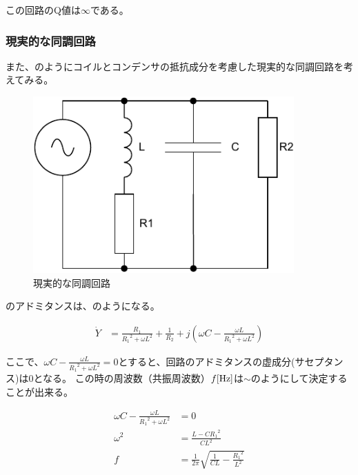 \documentclass[report.tex]{subfiles}
\begin{document}
この回路のQ値は\(\infty\)である。

\subsubsection{現実的な同調回路}\label{sec:real}

また、のようにコイルとコンデンサの抵抗成分を考慮した現実的な同調回路を考えてみる。

\begin{figure}[H]
	\centering
	\includegraphics[width=10cm]{fig/kyo2.pdf}
	\caption{現実的な同調回路}
	\label{fig:kyo2}
\end{figure}

のアドミタンスは、のようになる。

\begin{align}
	\dot{Y} & = \frac{R_1}{{R_1}^2+ {\omega L}^2} + \frac{1}{R_2} + j(\omega C - \frac{\omega L}{{R_1}^2+ {\omega L}^2})\label{eq:impedance2}
\end{align}

ここで、$\omega C - \frac{\omega L}{{R_1}^2+ {\omega L}^2} = 0$とすると、回路のアドミタンスの虚成分(サセプタンス)は0となる。
この時の周波数（共振周波数）\(f\rm{[Hz]}\)は\(\sim\)のようにして決定することが出来る。

\begin{align}
	\omega C - \frac{\omega L}{{R_1}^2+ {\omega L}^2} & = 0 \label{eq:kyousin}                                                           \\
	\omega ^2                                         & = \frac{L - {CR_1}^2}{CL^2}                                                      \\
	f                                                 & = \frac{1}{2 \pi} \sqrt{\frac{1}{CL} - {\frac{{R_1}^2}{L^2}}}\label{eq:kyousin2}
\end{align}
\end{document}

